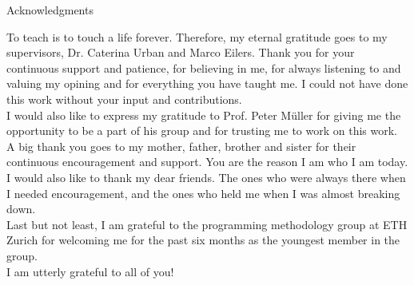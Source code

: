 \thispagestyle{empty}

\vspace*{20mm}

\begin{center}
{ Acknowledgments}
\end{center}

\vspace{10mm}

To teach is to touch a life forever. Therefore, my eternal gratitude goes to my supervisors, Dr. Caterina Urban and Marco Eilers. Thank you for your continuous support and patience, for believing in me, for always listening to and valuing my opining and for everything you have taught me. I could not have done this work without your input and contributions. \\

I would also like to express my gratitude to Prof. Peter Müller for giving me the opportunity to be a part of his group and for trusting me to work on this work. \\

A big thank you goes to my mother, father, brother and sister for their continuous encouragement and support. You are the reason I am who I am today. \\

I would also like to thank my dear friends. The ones who were always there when I needed encouragement, and the ones who held me when I was almost breaking down. \\

Last but not least, I am grateful to the programming methodology group at ETH Zurich for welcoming me for the past six months as the youngest member in the group. \\

I am utterly grateful to all of you!
\cleardoublepage{}
